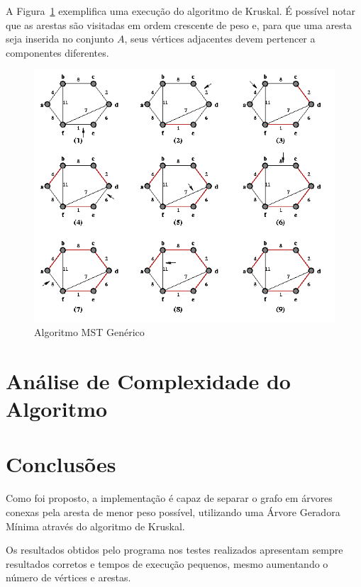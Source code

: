 \documentclass[12pt]{article}
\begin{document}
A Figura~\ref{fig:exec_kruskal} exemplifica uma execução do algoritmo de Kruskal. É possível notar que as arestas são visitadas em ordem crescente de peso e, para que uma aresta seja inserida no conjunto $A$, seus vértices adjacentes devem pertencer a componentes diferentes.

\begin{figure}[ht]
    \centering
    \includegraphics[width=1\textwidth]{imagens/execucao_kruskal.png}
    \caption{Algoritmo MST Genérico}
    \label{fig:exec_kruskal}
\end{figure}


\section{Análise de Complexidade do Algoritmo}

\section{Conclusões}
Como foi proposto, a implementação é capaz de separar o grafo em árvores conexas pela aresta de menor peso possível, utilizando uma Árvore Geradora Mínima através do algoritmo de Kruskal.

	Os resultados obtidos pelo programa nos testes realizados apresentam sempre resultados corretos e tempos de execução pequenos, mesmo aumentando o número de vértices e arestas.




\end{document}

